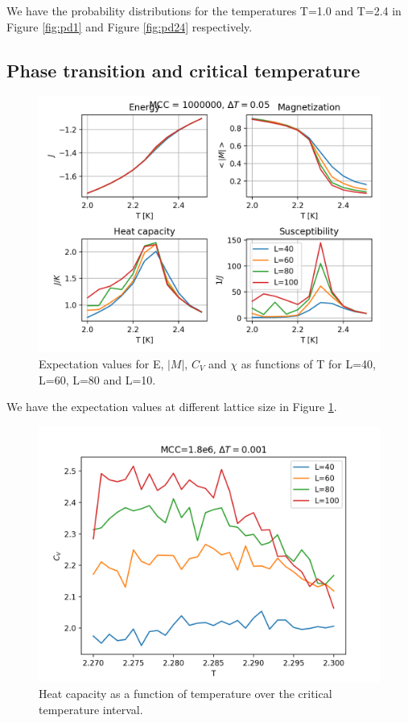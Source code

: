 \documentclass{article}
\begin{document}
\begin{multicols}{2}
We have the probability distributions for the temperatures T=1.0 and T=2.4 in Figure \ref{fig:pd1} and Figure \ref{fig:pd24} respectively. 

\subsection*{Phase transition and critical temperature}

\begin{figure}[H]
	\centering
	\includegraphics[width=\linewidth]{Exp_values.png}
	\caption{Expectation values for E, $|M|$, $C_V$ and $\chi$ as functions of T for L=40, L=60, L=80 and L=10.}
	\label{fig:exp}
\end{figure}

We have the expectation values at different lattice size in Figure \ref{fig:exp}.

\begin{figure}[H]
	\centering
	\includegraphics[width=\linewidth]{Exp_values_zoom.png}
	\caption{Heat capacity as a function of temperature over the critical temperature interval.}
	\label{fig:C_T}
\end{figure}


\end{multicols}
\end{document}
